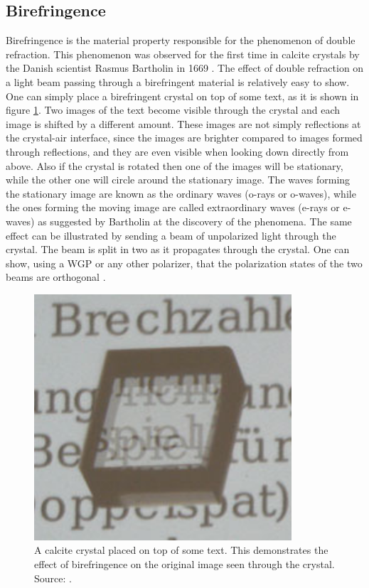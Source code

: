 \subsection{Birefringence}
\label{sec:birefringence}
Birefringence is the material property responsible for the phenomenon of double refraction. This phenomenon was observed for the first time in calcite crystals by the Danish scientist Rasmus Bartholin in 1669 \cite{RasmusBartholin1669, Restaino2015}. The effect of double refraction on a light beam passing through a birefringent material is relatively easy to show. One can simply place a birefringent crystal on top of some text, as it is shown in figure \ref{fig:3birefringence}. Two images of the text become visible through the crystal and each image is shifted by a different amount. These images are not simply reflections at the crystal-air interface, since the images are brighter compared to images formed through reflections, and they are even visible when looking down directly from above. Also if the crystal is rotated then one of the images will be stationary, while the other one will circle around the stationary image. The waves forming the stationary image are known as the ordinary waves (o-rays or o-waves), while the ones forming the moving image are called extraordinary waves (e-rays or e-waves) as suggested by Bartholin at the discovery of the phenomena. The same effect can be illustrated by sending a beam of unpolarized light through the crystal. The beam is split in two as it propagates through the crystal. One can show, using a WGP or any other polarizer, that the polarization states of the two beams are orthogonal \cite{Roth2019}.

\begin{figure}[h]
    \centering
    \includegraphics[scale=0.25]{images/theory/birefringence.png}
    \caption{A calcite crystal placed on top of some text. This demonstrates the effect of birefringence on the original image seen through the crystal. Source: \cite{Roth2019}.}
    \label{fig:3birefringence}
\end{figure}


